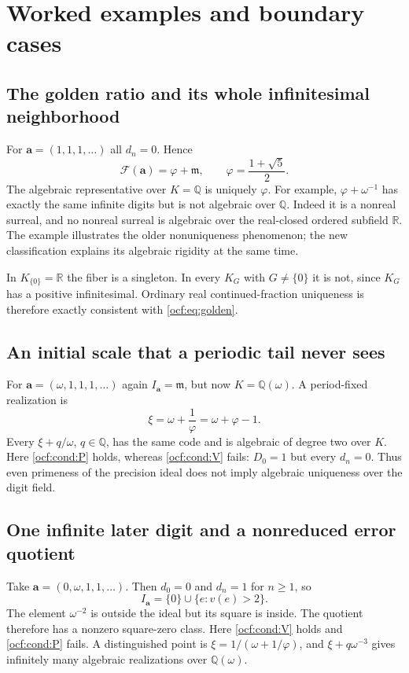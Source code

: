 \documentclass[11pt,a4paper]{article}
\numberwithin{equation}{section}
\theoremstyle{definition}
\theoremstyle{remark}
\newcommand{\R}{\mathbb R}
\newcommand{\Q}{\mathbb Q}
\newcommand{\mm}{\mathfrak m}
\newcommand{\F}{\mathcal F}
\newcommand{\codea}{\boldsymbol a}
\begin{document}
\section{Worked examples and boundary cases}
\label{ocf:sec:examples}

\subsection{The golden ratio and its whole infinitesimal neighborhood}

For $\codea=(1,1,1,\ldots)$ all $d_n=0$. Hence
\begin{equation}\label{ocf:eq:golden}
 \F(\codea)=\varphi+\mm,
 \qquad \varphi=\frac{1+\sqrt5}{2}.
\end{equation}
The algebraic representative over $K=\Q$ is uniquely $\varphi$. For
example, $\varphi+\omega^{-1}$ has exactly the same infinite digits but is
not algebraic over $\Q$. Indeed it is a nonreal surreal, and no nonreal
surreal is algebraic over the real-closed ordered subfield $\R$.
The example illustrates the older nonuniqueness phenomenon; the new
classification explains its algebraic rigidity at the same time.

In $K_{\{0\}}=\R$ the fiber is a singleton. In every $K_G$ with
$G\ne\{0\}$ it is not, since $K_G$ has a positive infinitesimal. Ordinary
real continued-fraction uniqueness is therefore exactly consistent with
\eqref{ocf:eq:golden}.

\subsection{An initial scale that a periodic tail never sees}

For $\codea=(\omega,1,1,1,\ldots)$ again $I_{\codea}=\mm$, but now
$K=\Q(\omega)$. A period-fixed realization is
\[
 \xi=\omega+\frac1\varphi=\omega+\varphi-1.
\]
Every $\xi+q/\omega$, $q\in\Q$, has the same code and is algebraic of
degree two over $K$. Here \eqref{ocf:cond:P} holds, whereas
\eqref{ocf:cond:V} fails: $D_0=1$ but every $d_n=0$.
Thus even primeness of the precision ideal does not imply algebraic
uniqueness over the digit field.

\subsection{One infinite later digit and a nonreduced error quotient}

Take $\codea=(0,\omega,1,1,\ldots)$. Then
$d_0=0$ and $d_n=1$ for $n\ge1$, so
\[
 I_{\codea}=\{0\}\cup\{e:v(e)>2\}.
\]
The element $\omega^{-2}$ is outside the ideal but its square is inside.
The quotient therefore has a nonzero square-zero class. Here
\eqref{ocf:cond:V} holds and \eqref{ocf:cond:P} fails. A distinguished point is
$\xi=1/(\omega+1/\varphi)$, and $\xi+q\omega^{-3}$ gives infinitely many
algebraic realizations over $\Q(\omega)$.
\end{document}
